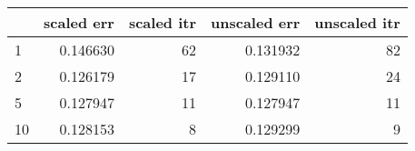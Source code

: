 \begin{tabular}{lrrrr}
\toprule
{} &  scaled err &  scaled itr &  unscaled err &  unscaled itr \\
\midrule
1  &    0.146630 &          62 &      0.131932 &            82 \\
2  &    0.126179 &          17 &      0.129110 &            24 \\
5  &    0.127947 &          11 &      0.127947 &            11 \\
10 &    0.128153 &           8 &      0.129299 &             9 \\
\bottomrule
\end{tabular}
